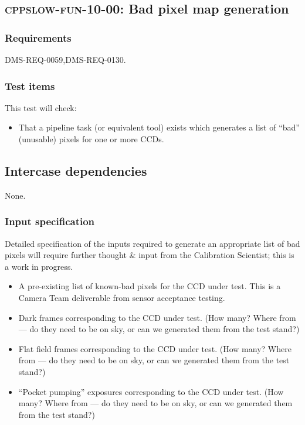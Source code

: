\subsection{\textsc{cppslow-fun-10-00}: Bad pixel map generation}
\label{cppslow-fun-10-00}

\subsubsection{Requirements}

DMS-REQ-0059,DMS-REQ-0130.

\subsubsection{Test items}

This test will check:

\begin{itemize}

  \item{That a pipeline task (or equivalent tool) exists which generates a list
  of ``bad'' (unusable) pixels for one or more CCDs.}

\end{itemize}

\subsection{Intercase dependencies}

None.

\subsubsection{Input specification}

\begin{note}
Detailed specification of the inputs required to generate an appropriate list of
bad pixels will require further thought \& input from the Calibration Scientist;
this is a work in progress.
\end{note}

\begin{itemize}

  \item{A pre-existing list of known-bad pixels for the CCD under test. This is a Camera Team
  deliverable from sensor acceptance testing.}

  \item{Dark frames corresponding to the CCD under test. (How many? Where from —
  do they need to be on sky, or can we generated them from the test stand?)}

  \item{Flat field frames corresponding to the CCD under test. (How many? Where from —
  do they need to be on sky, or can we generated them from the test stand?)}

  \item{``Pocket pumping'' exposures corresponding to the CCD under test.  (How
  many? Where from — do they need to be on sky, or can we generated them from
  the test stand?)}

\end{itemize}

